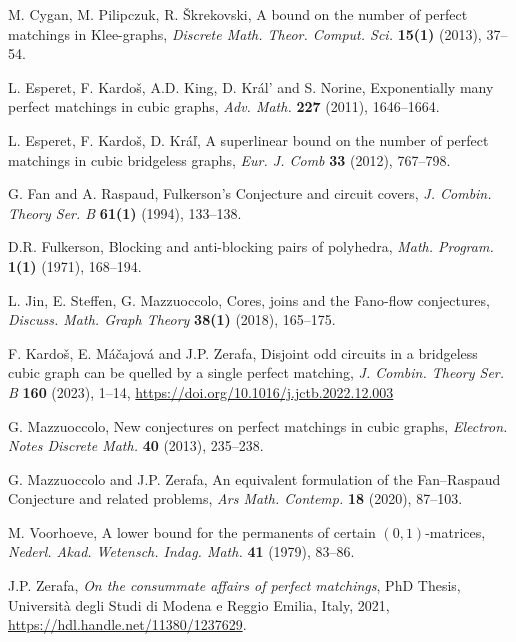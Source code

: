 \documentclass[]{theclass}
\begin{document}
\begin{thebibliography}{99}

M. Cygan, M. Pilipczuk, R. \v{S}krekovski,
A bound on the number of perfect matchings in Klee-graphs,
\emph{Discrete Math. Theor. Comput. Sci.} \textbf{15(1)} (2013), 37--54.

L. Esperet, F. Kardo\v{s}, A.D. King, D. Kr\'{a}l$\!$' and S. Norine,
Exponentially many perfect matchings in cubic graphs,
\emph{Adv. Math.} \textbf{227} (2011), 1646--1664.

L. Esperet, F. Kardoš, D. Kráľ, A superlinear bound on the number of perfect matchings in cubic bridgeless graphs, \emph{Eur. J. Comb} \textbf{33} (2012), 767--798.

G. Fan and A. Raspaud,
Fulkerson's Conjecture and circuit covers,
\emph{J. Combin. Theory Ser. B} \textbf{61(1)} (1994), 133--138.

D.R. Fulkerson,
Blocking and anti-blocking pairs of polyhedra,
\emph{Math. Program.} \textbf{1(1)} (1971), 168--194.



L. Jin, E. Steffen, G. Mazzuoccolo,
Cores, joins and the Fano-flow conjectures,
\emph{Discuss. Math. Graph Theory} \textbf{38(1)} (2018), 165--175.

F. Kardoš, E. M\'{a}\v{c}ajov\'{a} and J.P. Zerafa, Disjoint odd circuits in a bridgeless cubic graph can be quelled by a single perfect matching, \emph{J. Combin. Theory Ser. B} \textbf{160} (2023), 1--14, \url{https://doi.org/10.1016/j.jctb.2022.12.003}





G. Mazzuoccolo,
New conjectures on perfect matchings in cubic graphs,
\emph{Electron. Notes Discrete Math.} \textbf{40} (2013), 235--238.



G. Mazzuoccolo and J.P. Zerafa,
An equivalent formulation of the Fan--Raspaud Conjecture
and related problems, \emph{Ars Math. Contemp.} \textbf{18} (2020), 87--103.



M. Voorhoeve, A lower bound for the permanents of certain $(0,1)$-matrices, \emph{Nederl. Akad. Wetensch. Indag. Math.} \textbf{41} (1979), 83--86.

J.P. Zerafa, \emph{On the consummate affairs of perfect matchings}, PhD Thesis, Universit\`a degli Studi di Modena e Reggio Emilia, Italy, 2021, \url{https://hdl.handle.net/11380/1237629}.
\end{thebibliography}
\end{document}
